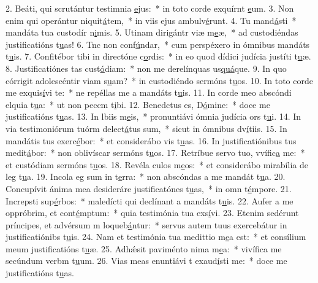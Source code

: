 2. Beáti, qui scrutántur testimnia \uline{e}jus:~* in toto corde exquírnt \uline{e}um.
3. Non enim qui operántur niquit\uline{á}tem,~* in viis ejus ambulv\uline{é}runt.
4. Tu mand\uline{á}sti~* mandáta tua custodír n\uline{i}mis.
5. Utinam dirigántr viæ m\uline{e}æ,~* ad custodiéndas justificatións t\uline{u}as!
6. Tnc non conf\uline{ú}ndar,~* cum perspéxero in ómnibus mandáts t\uline{u}is.
7. Confitébor tibi in directóne c\uline{o}rdis:~* in eo quod dídici judícia justíti t\uline{u}æ.
8. Justificatiónes tas cust\uline{ó}diam:~* non me derelínquas us\uline{quá}que.
9. In quo córrigit adolescéntir viam s\uline{u}am?~* in custodiéndo sermóns t\uline{u}os.
10. In toto corde me exquis\uline{í}vi te:~* ne repéllas me a mandáts t\uline{u}is.
11. In corde meo abscóndi elquia t\uline{u}a:~* ut non peccm t\uline{i}bi.
12. Benedctus es, D\uline{ó}mine:~* doce me justificatións t\uline{u}as.
13. In lbiis m\uline{e}is,~* pronuntiávi ómnia judícia ors t\uline{u}i.
14. In via testimoniórum tuórm delect\uline{á}tus sum,~* sicut in ómnibus dv\uline{í}tiis.
15. In mandátis tus exerc\uline{é}bor:~* et considerábo vis t\uline{u}as.
16. In justificatiónibus tus medit\uline{á}bor:~* non oblivíscar sermóns t\uline{u}os.
17. Retríbue servo tuo, vvífic\uline{a} me:~* et custódiam sermóns t\uline{u}os.
18. Revéla culos m\uline{e}os:~* et considerábo mirabília de leg t\uline{u}a.
19. Incola eg sum in t\uline{e}rra:~* non abscóndas a me mandát t\uline{u}a.
20. Concupívit ánima mea desideráre justificatónes t\uline{u}as,~* in omn t\uline{é}mpore.
21. Increpsti sup\uline{é}rbos:~* maledícti qui declínant a mandáts t\uline{u}is.
22. Aufer a me oppróbrim, et cont\uline{é}mptum:~* quia testimónia tua exs\uline{í}vi.
23. Etenim sedérunt príncipes, et advérsum m loqueb\uline{á}ntur:~* servus autem tuus exercebátur in justificatiónibs t\uline{u}is.
24. Nam et testimónia tua medittio m\uline{e}a est:~* et consílium meum justificatións t\uline{u}æ.
25. Adhǽsit paviménto nima m\uline{e}a:~* vivífica me secúndum verbm t\uline{u}um.
26. Vias meas enuntiávi t exaud\uline{í}sti me:~* doce me justificatións t\uline{u}as.
